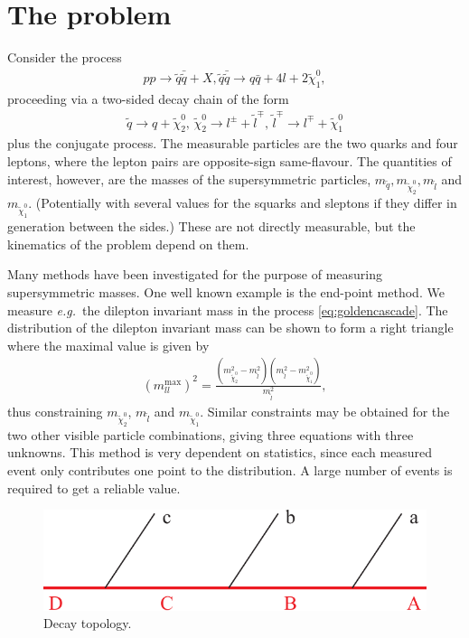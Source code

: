 \documentclass[twoside,english]{uiofysmaster}
\begin{document}
\section{The problem}
Consider the process
\begin{align}
	pp \to \tilde{q}\bar{\tilde{q}} + X, \tilde{q}\bar{\tilde{q}} \to q\bar{q} + 4l + 2\tilde{\chi}_1^0,
\end{align}
proceeding via a two-sided decay chain of the form
\begin{align}
	\tilde{q} \to q + \tilde{\chi}_2^0, \, \tilde{\chi}_2^0 \to l^{\pm} + \tilde{l}^\mp, \, \tilde{l}^\mp \to l^\mp + \tilde{\chi}_1^0\label{eq:goldencascade}
\end{align}
plus the conjugate process. The measurable particles are the two quarks and four leptons, where the lepton pairs are opposite-sign same-flavour. The quantities of interest, however, are the masses of the supersymmetric particles, $m_{\tilde{q}}, m_{\tilde{\chi}_2^0}, m_{\tilde{l}}$ and $m_{\tilde{\chi}_1^0}$. (Potentially with several values for the squarks and sleptons if they differ in generation between the sides.) These are not directly measurable, but the kinematics of the problem depend on them. 

Many methods have been investigated for the purpose of measuring supersymmetric masses. One well known example is the end-point method. We measure {\it e.g.}\ the dilepton invariant mass in the process \eqref{eq:goldencascade}. The distribution of the dilepton invariant mass can be shown to form a right triangle where the maximal value is given by
\begin{align}
	(m_{ll}^\mathrm{max})^2 = \frac{ \left( m^2_{\tilde{\chi}_2^0} - m^2_{\tilde{l}} \right) \left( m^2_{\tilde{l}} - m^2_{\tilde{\chi}_1^0} \right)}{m^2_{\tilde{l}}}, \label{eq:invariant_mass_endpoint}
\end{align}
thus constraining $m_{\tilde{\chi}_2^0}$, $m_{\tilde{l}}$ and $m_{\tilde{\chi}_1^0}$. Similar constraints may be obtained for the two other visible particle combinations, giving three equations with three unknowns. This method is very dependent on statistics, since each measured event only contributes one point to the distribution. A large number of events is required to get a reliable value.

\begin{figure}[hbt]
\centering
\includegraphics[scale=0.7]{figures/fig-chain.pdf} %
\caption{Decay topology.}
\label{fig:decaytree}
\end{figure}
\end{document}
